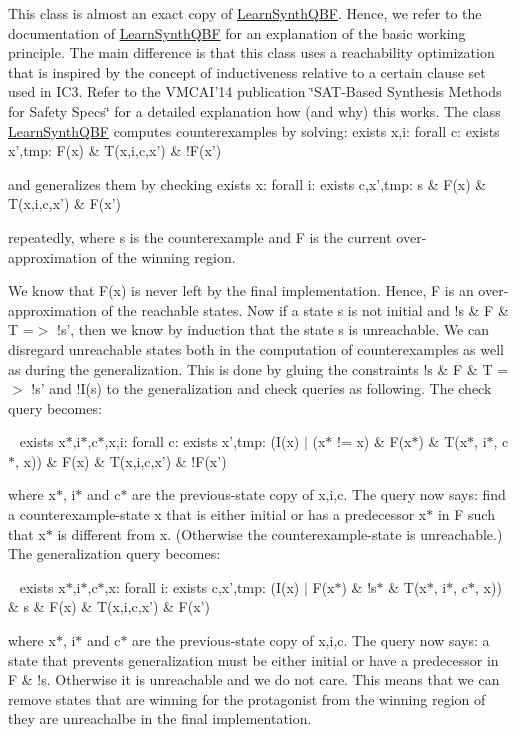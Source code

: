 This class is almost an exact copy of \hyperlink{classLearnSynthQBF}{Learn\-Synth\-Q\-B\-F}. Hence, we refer to the documentation of \hyperlink{classLearnSynthQBF}{Learn\-Synth\-Q\-B\-F} for an explanation of the basic working principle. The main difference is that this class uses a reachability optimization that is inspired by the concept of inductiveness relative to a certain clause set used in I\-C3. Refer to the V\-M\-C\-A\-I'14 publication \char`\"{}\-S\-A\-T-\/\-Based Synthesis Methods for Safety Specs\char`\"{} for a detailed explanation how (and why) this works. The class \hyperlink{classLearnSynthQBF}{Learn\-Synth\-Q\-B\-F} computes counterexamples by solving\-: exists x,i\-: forall c\-: exists x',tmp\-: F(x) \& T(x,i,c,x') \& !\-F(x') \par
 and generalizes them by checking exists x\-: forall i\-: exists c,x',tmp\-: s \& F(x) \& T(x,i,c,x') \& F(x') \par
 repeatedly, where s is the counterexample and F is the current over-\/approximation of the winning region.

We know that F(x) is never left by the final implementation. Hence, F is an over-\/approximation of the reachable states. Now if a state s is not initial and !s \& F \& T =$>$ !s', then we know by induction that the state s is unreachable. We can disregard unreachable states both in the computation of counterexamples as well as during the generalization. This is done by gluing the constraints !s \& F \& T =$>$ !s' and !\-I(s) to the generalization and check queries as following. The check query becomes\-: \par
 ~ exists x$\ast$,i$\ast$,c$\ast$,x,i\-: forall c\-: exists x',tmp\-: (I(x) $|$ (x$\ast$ != x) \& F(x$\ast$) \& T(x$\ast$, i$\ast$, c$\ast$, x)) \& F(x) \& T(x,i,c,x') \& !\-F(x') \par
 where x$\ast$, i$\ast$ and c$\ast$ are the previous-\/state copy of x,i,c. The query now says\-: find a counterexample-\/state x that is either initial or has a predecessor x$\ast$ in F such that x$\ast$ is different from x. (Otherwise the counterexample-\/state is unreachable.) The generalization query becomes\-: \par
 ~ exists x$\ast$,i$\ast$,c$\ast$,x\-: forall i\-: exists c,x',tmp\-: (I(x) $|$ F(x$\ast$) \& !s$\ast$ \& T(x$\ast$, i$\ast$, c$\ast$, x)) \& s \& F(x) \& T(x,i,c,x') \& F(x') \par
 where x$\ast$, i$\ast$ and c$\ast$ are the previous-\/state copy of x,i,c. The query now says\-: a state that prevents generalization must be either initial or have a predecessor in F \& !s. Otherwise it is unreachable and we do not care. This means that we can remove states that are winning for the protagonist from the winning region of they are unreachalbe in the final implementation.

